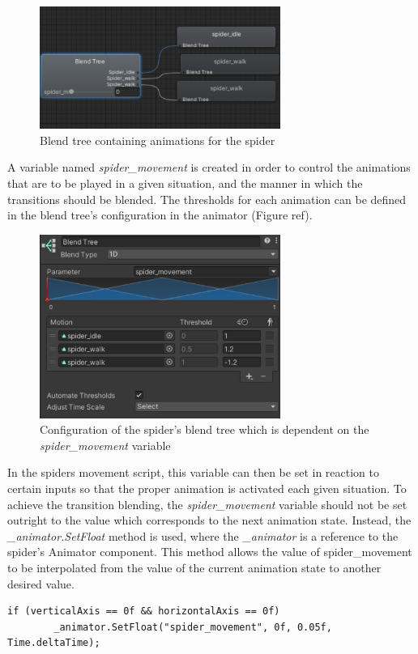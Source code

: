 \begin{figure}[h!]
    \centering
    \includegraphics[width=0.7\textwidth]{grafika/spider_blend.png}
    \caption{Blend tree containing animations for the spider}
    \label{fig:s_blendtree}
\end{figure}

A variable named \textit{spider\_movement} is created in order to control the
animations that are to be played in a given situation, and the manner in which
the transitions should be blended. The thresholds for each animation can be
defined in the blend tree's configuration in the animator (Figure ref).

\begin{figure}[h!]
    \centering
    \captionsetup{justification=centering}
    \includegraphics[width=0.7\textwidth]{grafika/spider_blendconf.png}
    \caption{Configuration of the spider's blend tree which is dependent on
    the \textit{spider\_movement} variable}
    \label{fig:s_blendconf}
\end{figure}

In the spiders movement script, this variable can then be set in reaction to
certain inputs so that the proper animation is activated each given situation.
To achieve the transition blending, the \textit{spider\_movement} variable
should not be set outright to the value which corresponds to the next animation
state. Instead, the \textit{\_animator.SetFloat} method is used, where the
\textit{\_animator} is a reference to the spider's Animator component. This
method allows the value of spider\_movement to be interpolated from the value of
the current animation state to another desired value.
\newline
\begin{lstlisting}[basicstyle=\footnotesize, numbers=none,frame=single,
caption={Transitioning to the spider's idle animation using the
\textit{SetFloat} method},captionpos=b, label=stretch, language={[Sharp]c}]
    if (verticalAxis == 0f && horizontalAxis == 0f)
        _animator.SetFloat("spider_movement", 0f, 0.05f, Time.deltaTime);
\end{lstlisting}

